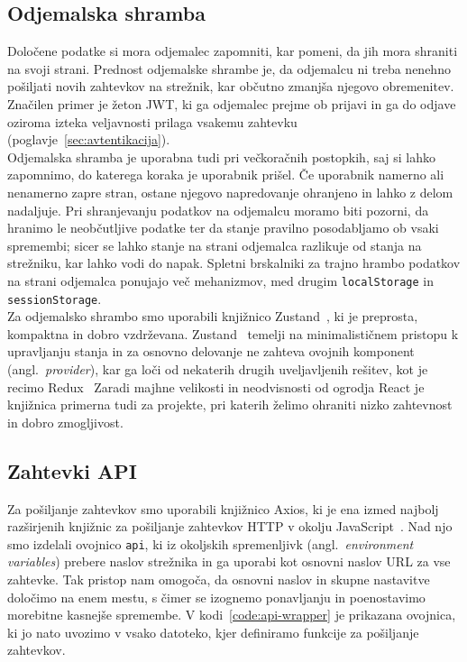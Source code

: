 \documentclass[a4paper,12pt,openright]{book}
\begin{document}
\subsection{Odjemalska shramba}
Določene podatke si mora odjemalec zapomniti, kar pomeni, da jih mora shraniti na svoji strani. Prednost
odjemalske shrambe je, da odjemalcu ni treba nenehno pošiljati novih zahtevkov na strežnik, kar občutno
zmanjša njegovo obremenitev. Značilen primer je žeton JWT, ki ga odjemalec prejme ob
prijavi in ga do odjave oziroma izteka veljavnosti prilaga vsakemu zahtevku
(poglavje~\ref{sec:avtentikacija}).\\
Odjemalska shramba je uporabna tudi pri večkoračnih postopkih, saj si lahko zapomnimo, do katerega koraka
je uporabnik prišel. Če uporabnik namerno ali nenamerno zapre stran, ostane njegovo napredovanje ohranjeno
in lahko z delom nadaljuje. Pri shranjevanju podatkov na odjemalcu moramo biti pozorni, da hranimo le
neobčutljive podatke ter da stanje pravilno posodabljamo ob vsaki spremembi; sicer se lahko stanje na
strani odjemalca razlikuje od stanja na strežniku, kar lahko vodi do napak. Spletni brskalniki za trajno
hrambo podatkov na strani odjemalca ponujajo več mehanizmov, med drugim \texttt{localStorage} in
\texttt{sessionStorage}.\\
Za odjemalsko shrambo smo uporabili knjižnico Zustand~\cite{zustand-docs}, ki je preprosta, kompaktna in dobro vzdrževana.
Zustand~\cite{zustand-docs} temelji na minimalističnem pristopu k upravljanju stanja in za osnovno delovanje ne zahteva ovojnih
komponent (angl.\ \textit{provider}), kar ga loči od nekaterih drugih uveljavljenih rešitev, kot je recimo Redux~\cite{redux-docs}
 Zaradi majhne velikosti in neodvisnosti od ogrodja React
je knjižnica primerna tudi za projekte, pri katerih želimo ohraniti nizko zahtevnost in dobro zmogljivost.\\

\subsection{Zahtevki API}
Za pošiljanje zahtevkov smo uporabili knjižnico Axios, ki je ena izmed najbolj razširjenih knjižnic za
pošiljanje zahtevkov HTTP v okolju JavaScript~\cite{flanagan2020javascript,axios-docs}. Nad njo smo izdelali ovojnico \texttt{api},
ki iz okoljskih spremenljivk (angl.\ \textit{environment variables}) prebere naslov strežnika in ga uporabi
kot osnovni naslov URL za vse zahtevke. Tak pristop nam omogoča, da osnovni naslov in skupne nastavitve
določimo na enem mestu, s čimer se izognemo ponavljanju in poenostavimo morebitne kasnejše spremembe. V kodi~\ref{code:api-wrapper}
 je prikazana ovojnica, ki jo nato uvozimo v vsako datoteko, kjer definiramo funkcije za pošiljanje zahtevkov.
\end{document}
